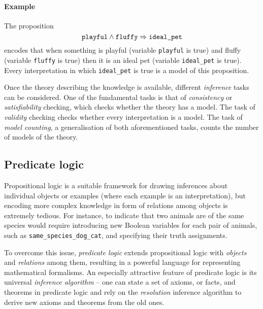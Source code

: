 \paragraph{Example} The proposition
$$\text{\texttt{playful}} \wedge \text{\texttt{fluffy}} \Rightarrow \text{\texttt{ideal\_pet}} $$
encodes that when something is playful (variable \texttt{playful} is true) and fluffy (variable \texttt{fluffy} is true) then it is an ideal pet (variable \texttt{ideal\_pet} is true).
Every interpretation in which \texttt{ideal\_pet} is true is a model of this proposition.




Once the theory describing the knowledge is available, different \textit{inference} tasks can be considered.
One of the fundamental tasks is that of \textit{consistency} or \textit{satisfiability} checking, which checks whether the theory has a model.
The task of \textit{validity} checking checks whether every interpretation is a model.
The task of \textit{model counting}, a generalisation of both aforementioned tasks, counts the number of models of the theory.









\subsection{Predicate logic}


Propositional logic is a suitable framework for drawing inferences about individual objects or examples (where each example is an interpretation), but encoding more complex knowledge in form of relations among objects is extremely tedious.
For instance, to indicate that two animals are of the same species would require introducing new Boolean variables for each pair of animals, such as \texttt{same\_species\_dog\_cat}, and specifying their truth assignments.



To overcome this issue, \textit{predicate logic} extends  propositional logic with \textit{objects} and \textit{relations} among them, resulting in a powerful language for representing mathematical formalisms.
An especially attractive feature of predicate logic is its universal \textit{inference algorithm} -- one can state a set of axioms, or facts, and theorems in predicate logic and rely on the \textit{resolution} \cite{Robinson:1965:Resolution} inference algorithm to derive new axioms and theorems from the old ones.




